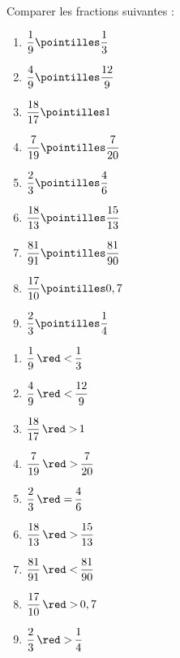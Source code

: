 \begin{exercice*}
   Comparer les fractions suivantes : \medskip
   \begin{multicols}{3}
      \begin{enumerate}
      \item $\dfrac{1}{9} \pointilles \dfrac{1}{3}$ \bigskip
      \item $\dfrac{4}{9} \pointilles \dfrac{12}{9}$ \bigskip
      \item $\dfrac{18}{17} \pointilles 1$ \bigskip
      \item $\dfrac{7}{19} \pointilles \dfrac{7}{20}$
      \item $\dfrac{2}{3} \pointilles \dfrac{4}{6}$
      \item $\dfrac{18}{13} \pointilles \dfrac{15}{13}$
      \item $\dfrac{81}{91} \pointilles \dfrac{81}{90}$
      \item $\dfrac{17}{10} \pointilles 0,7$
      \item $\dfrac{2}{3} \pointilles \dfrac{1}{4}$
   \end{enumerate}
\end{multicols}
 \end{exercice*}
 \begin{corrige}
   \begin{multicols}{3}
      \begin{enumerate}
      \item $\dfrac{1}{9} \, {\red <} \, \dfrac{1}{3}$ \bigskip
      \item $\dfrac{4}{9} \, {\red <} \,\dfrac{12}{9}$ \bigskip
      \item $\dfrac{18}{17} \, {\red >} \,1$
      \item $\dfrac{7}{19} \, {\red >} \,\dfrac{7}{20}$
      \item $\dfrac{2}{3} \, {\red =} \,\dfrac{4}{6}$
      \item $\dfrac{18}{13} \, {\red >} \,\dfrac{15}{13}$
      \item $\dfrac{81}{91} \, {\red <} \,\dfrac{81}{90}$
      \item $\dfrac{17}{10} \, {\red >} \,0,7$
      \item $\dfrac{2}{3} \, {\red >} \,\dfrac{1}{4}$
   \end{enumerate}
\end{multicols}
 \end{corrige}